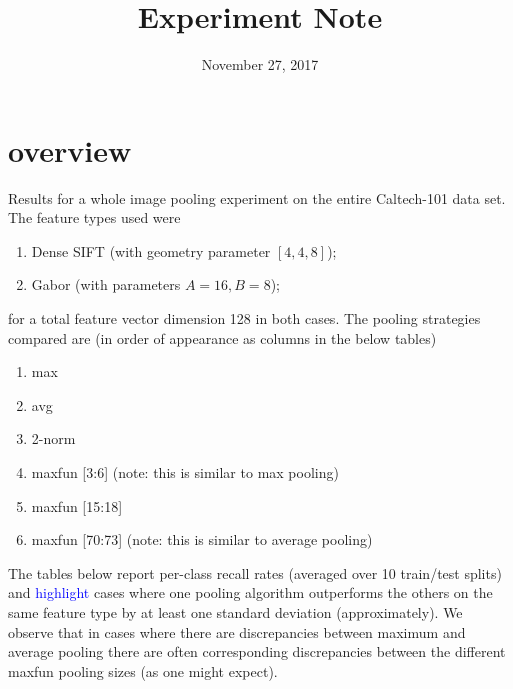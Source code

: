 \documentclass[10pt]{article}
\title{Experiment Note}
\date{November 27, 2017}
\newcommand{\hl}[1]{\textcolor{blue}{#1}}
\begin{document}
\maketitle

\section*{overview}
Results for a whole image pooling experiment on the entire Caltech-101 data set.  The feature types used were
\begin{enumerate}
\item Dense SIFT (with geometry parameter $[4, 4, 8]$);
\item Gabor  (with parameters $A=16, B=8$);
\end{enumerate}
%
for a total feature vector dimension 128 in both cases.
The pooling strategies compared are (in order of appearance as columns in the below tables)
%
\begin{enumerate}
\item max
\item avg
\item 2-norm
\item maxfun [3:6]       (note: this is similar to max pooling)
\item maxfun [15:18]
\item maxfun [70:73]  (note: this is similar to average pooling)
\end{enumerate}


The tables below report per-class recall rates (averaged over 10 train/test splits) and \hl{highlight} cases where one pooling algorithm outperforms the others on the same feature type by at least one standard deviation (approximately).
We observe that in cases where there are discrepancies between maximum and average pooling there are often corresponding discrepancies between the different maxfun pooling sizes (as one might expect).
\end{document}
